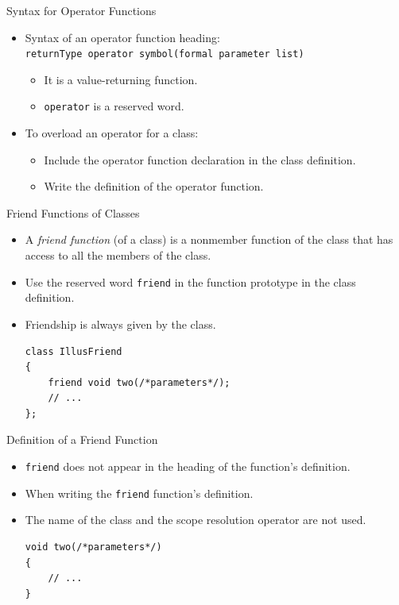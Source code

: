 \documentclass[14pt,aspectratio=1610, hyperref={pdfpagelayout=SinglePage}]{beamer}
\begin{document}
\begin{frame}[fragile]{Syntax for Operator Functions}
\protect\hypertarget{syntax-for-operator-functions}{}
\begin{itemize}
\item
  Syntax of an operator function heading:\\
  \lstinline{returnType operator symbol(formal parameter list)}
  \begin{itemize}
  \item
    It is a value-returning function.
  \item
    \lstinline{operator} is a reserved word.
  \end{itemize}
\item
  To overload an operator for a class:
  \begin{itemize}
  \item
    Include the operator function declaration in the class definition.
  \item
    Write the definition of the operator function.
  \end{itemize}
\end{itemize}
\end{frame}



\begin{frame}[fragile]{Friend Functions of Classes}
\protect\hypertarget{friend-functions-of-classes}{}
\begin{itemize}
\item
  A \emph{friend function} (of a class) is a nonmember function of the class 
  that has access to all the members of the class.
\item
  Use the reserved word \lstinline{friend} in the function prototype in the
  class definition.
\item
  Friendship is always given by the class.

\begin{lstlisting}[basicstyle=\ttfamily\small]
class IllusFriend
{
    friend void two(/*parameters*/);
    // ...
};
\end{lstlisting}
\end{itemize}
\end{frame}

\begin{frame}[fragile]{Definition of a Friend Function}
\protect\hypertarget{definition-of-a-friend-function}{}
\begin{itemize}
\item
  \lstinline{friend} does not appear in the heading of the function's
  definition.
\item
  When writing the \lstinline{friend} function's definition.
\item
  The name of the class and the scope resolution operator are not used.

\begin{lstlisting}[basicstyle=\ttfamily\small]
void two(/*parameters*/)
{
    // ...
}
\end{lstlisting}
\end{itemize}
\end{frame}
\end{document}
